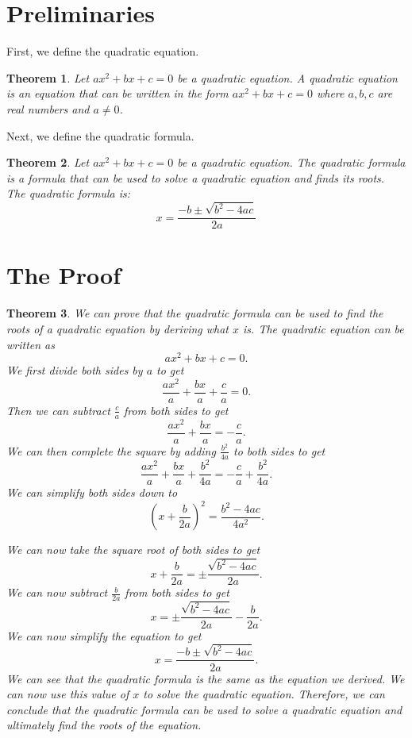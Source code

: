 \documentclass[12pt]{article}
\newtheorem{Theorem}{Theorem}
\begin{document}
\section{Preliminaries}
\label{sec:Preliminaries}
First, we define the quadratic equation.
\begin{Theorem}
Let $ax^2 + bx + c = 0$ be a quadratic equation. A quadratic equation is an equation that can be written in the form $ax^2 + bx + c = 0$ where $a, b, c$ are real numbers and
$a \neq 0$.
\end{Theorem}
Next, we define the quadratic formula.
\begin{Theorem}
Let $ax^2 + bx + c = 0$ be a quadratic equation. The quadratic formula is a formula that can be used to solve a quadratic equation and finds its roots. The quadratic formula is:
\[x = \frac{-b \pm \sqrt{b^2 - 4ac}}{2a}\]
\end{Theorem}

\section{The Proof}
\label{sec:Proof}
\begin{Theorem}
We can prove that the quadratic formula can be used to find the roots of a quadratic equation by 
deriving what $x$ is. The quadratic equation can be written as
\[ax^2 + bx + c = 0.\]
We first divide both sides by $a$ to get
\[\frac{ax^2}{a} + \frac{bx}{a} + \frac{c}{a} = 0.\]
Then we can subtract $\frac{c}{a}$ from both sides to get
\[\frac{ax^2}{a} + \frac{bx}{a} = -\frac{c}{a}.\]
We can then complete the square by adding $\frac{b^2}{4a}$ to both sides to get
\[\frac{ax^2}{a} + \frac{bx}{a} + \frac{b^2}{4a} = -\frac{c}{a} + \frac{b^2}{4a}.\]
We can simplify both sides down to
\[\left(x + \frac{b}{2a}\right)^2 = \frac{b^2-4ac}{4a^2}.\]  

We can now take the square root of both sides to get
\[x + \frac{b}{2a} = \pm \frac{\sqrt{b^2-4ac}}{2a}.\]
We can now subtract $\frac{b}{2a}$ from both sides to get
\[x = \pm \frac{\sqrt{b^2-4ac}}{2a} - \frac{b}{2a}.\]
We can now simplify the equation to get
\[x = \frac{-b \pm \sqrt{b^2 - 4ac}}{2a}.\]
We can see that the quadratic formula is the same as the equation we derived.
We can now use this value of $x$ to solve the quadratic equation. 
Therefore, we can conclude that the quadratic
formula can be used to solve a quadratic equation and ultimately find the roots of the equation. \\

\end{Theorem}
\end{document}
